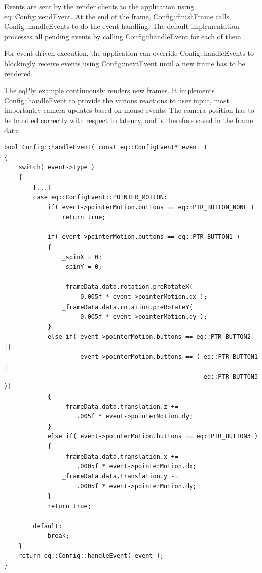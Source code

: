 \documentclass[10pt,a4]{scrartcl}
\begin{document}
Events are sent by the render clients to the application using
\textsf{eq::Config::sendEvent}. At the end of the frame,
\textsf{Config::finishFrame} calls \textsf{Config::handleEvents} to do
the event handling. The default implementation processes all pending
events by calling \textsf{Config::handleEvent} for each of them.

For event-driven execution, the application can override
\textsf{Config::handleEvents} to blockingly receive events using
\textsf{Config::nextEvent} until a new frame has to be rendered.

The \textsf{eqPly} example continuously renders new frames. It
implements \textsf{Config::hand\-le\-Event} to provide the various reactions
to user input, most importantly camera updates based on mouse
events. The camera position has to be handled correctly with respect to
latency, and is therefore saved in the frame data:

{\footnotesize\begin{lstlisting}
bool Config::handleEvent( const eq::ConfigEvent* event )
{
    switch( event->type )
    {
        [...]
        case eq::ConfigEvent::POINTER_MOTION:
            if( event->pointerMotion.buttons == eq::PTR_BUTTON_NONE )
                return true;

            if( event->pointerMotion.buttons == eq::PTR_BUTTON1 )
            {
                _spinX = 0;
                _spinY = 0;

                _frameData.data.rotation.preRotateX( 
                    -0.005f * event->pointerMotion.dx );
                _frameData.data.rotation.preRotateY(
                    -0.005f * event->pointerMotion.dy );
            }
            else if( event->pointerMotion.buttons == eq::PTR_BUTTON2 ||
                     event->pointerMotion.buttons == ( eq::PTR_BUTTON1 |
                                                       eq::PTR_BUTTON3 ))
            {
                _frameData.data.translation.z +=
                    .005f * event->pointerMotion.dy;
            }
            else if( event->pointerMotion.buttons == eq::PTR_BUTTON3 )
            {
                _frameData.data.translation.x += 
                    .0005f * event->pointerMotion.dx;
                _frameData.data.translation.y -= 
                    .0005f * event->pointerMotion.dy;
            }
            return true;

        default:
            break;
    }
    return eq::Config::handleEvent( event );
}
\end{lstlisting}}
\end{document}
